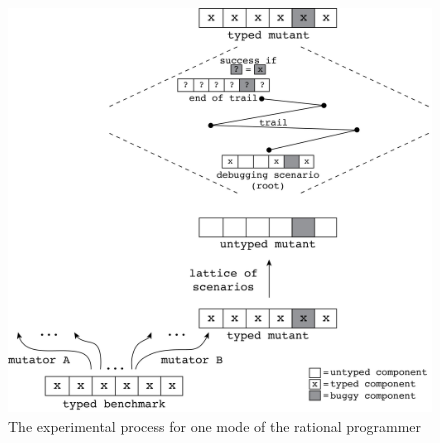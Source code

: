 \begin{figure}
  \centering
  \includegraphics[scale=0.36]{./Images/process}
  \caption{The experimental process for one mode of the rational
  programmer}
  \label{fig:process}
\end{figure}

